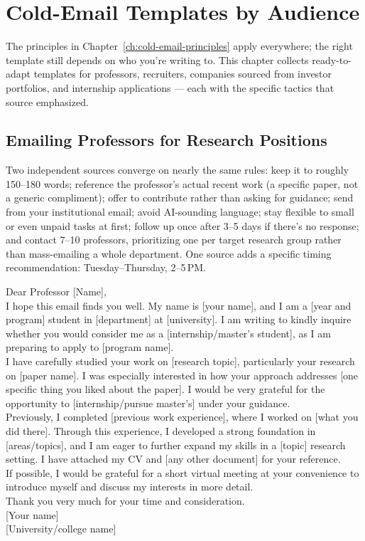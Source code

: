 \chapter{Cold-Email Templates by Audience}
\label{ch:cold-email-templates}

The principles in Chapter~\ref{ch:cold-email-principles} apply everywhere; the right template still depends on
who you're writing to. This chapter collects ready-to-adapt templates for professors, recruiters, companies
sourced from investor portfolios, and internship applications — each with the specific tactics that source
emphasized.

\section{Emailing Professors for Research Positions}

Two independent sources converge on nearly the same rules: keep it to roughly 150--180 words; reference the
professor's actual recent work (a specific paper, not a generic compliment); offer to contribute rather than
asking for guidance; send from your institutional email; avoid AI-sounding language; stay flexible to small or
even unpaid tasks at first; follow up once after 3--5 days if there's no response; and contact 7--10 professors,
prioritizing one per target research group rather than mass-emailing a whole department. One source adds a
specific timing recommendation: Tuesday--Thursday, 2--5\,PM.

\begin{template}
Dear Professor [Name],\\[4pt]
I hope this email finds you well. My name is [your name], and I am a [year and program] student in [department]
at [university]. I am writing to kindly inquire whether you would consider me as a [internship/master's
student], as I am preparing to apply to [program name].\\[4pt]
I have carefully studied your work on [research topic], particularly your research on [paper name]. I was
especially interested in how your approach addresses [one specific thing you liked about the paper]. I would be
very grateful for the opportunity to [internship/pursue master's] under your guidance.\\[4pt]
Previously, I completed [previous work experience], where I worked on [what you did there]. Through this
experience, I developed a strong foundation in [areas/topics], and I am eager to further expand my skills in a
[topic] research setting. I have attached my CV and [any other document] for your reference.\\[4pt]
If possible, I would be grateful for a short virtual meeting at your convenience to introduce myself and discuss
my interests in more detail.\\[4pt]
Thank you very much for your time and consideration.\\[4pt]
[Your name]\\{}
[University/college name]
\end{template}


